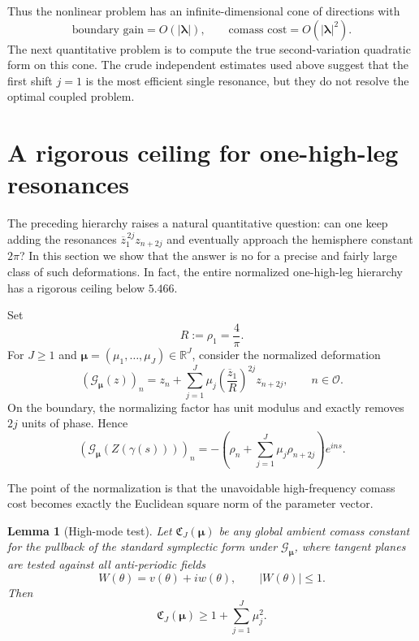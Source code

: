 \documentclass[11pt]{article}
\newtheorem{lemma}[theorem]{Lemma}
\newcommand{\R}{\mathbb R}
\begin{document}
Thus the nonlinear problem has an infinite-dimensional cone of directions
with
\[
        \text{boundary gain}=O(|\boldsymbol\lambda|),
        \qquad
        \text{comass cost}=O(|\boldsymbol\lambda|^2).
\]
The next quantitative problem is to compute the true second-variation
quadratic form on this cone.  The crude independent estimates used above
suggest that the first shift $j=1$ is the most efficient single resonance,
but they do not resolve the optimal coupled problem.


\section{A rigorous ceiling for one-high-leg resonances}
\label{sec:one-high-leg-ceiling}

The preceding hierarchy raises a natural quantitative question: can one keep
adding the resonances $\overline z_1^{\,2j}z_{n+2j}$ and eventually approach the
hemisphere constant $2\pi$?  In this section we show that the answer is no for a
precise and fairly large class of such deformations.  In fact, the entire
normalized one-high-leg hierarchy has a rigorous ceiling below $5.466$.

Set
\[
        R:=\rho_1=\frac4\pi.
\]
For $J\ge1$ and $\boldsymbol\mu=(\mu_1,\ldots,\mu_J)\in\R^J$, consider the
normalized deformation
\begin{equation}\label{eq:normalized-one-leg}
 (\mathcal G_{\boldsymbol\mu}(z))_n
 =z_n+\sum_{j=1}^J
 \mu_j\left(\frac{\overline z_1}{R}\right)^{2j}z_{n+2j},
 \qquad n\in\mathcal O.
\end{equation}
On the boundary, the normalizing factor has unit modulus and exactly removes
$2j$ units of phase.  Hence
\begin{equation}\label{eq:normalized-boundary}
 (\mathcal G_{\boldsymbol\mu}(Z(\gamma(s))))_n
 =-\left(\rho_n+\sum_{j=1}^J\mu_j\rho_{n+2j}\right)e^{ins}.
\end{equation}

The point of the normalization is that the unavoidable high-frequency comass
cost becomes exactly the Euclidean square norm of the parameter vector.

\begin{lemma}[High-mode test]\label{lem:high-mode-test}
Let $\mathfrak C_J(\boldsymbol\mu)$ be any global ambient comass constant for the
pullback of the standard symplectic form under
$\mathcal G_{\boldsymbol\mu}$, where tangent planes are tested against all
anti-periodic fields
\[
        W(\theta)=v(\theta)+iw(\theta),
        \qquad |W(\theta)|\le1.
\]
Then
\begin{equation}\label{eq:high-mode-cost}
        \boxed{
        \mathfrak C_J(\boldsymbol\mu)
        \ge1+\sum_{j=1}^J\mu_j^2.}
\end{equation}
\end{lemma}
\end{document}
